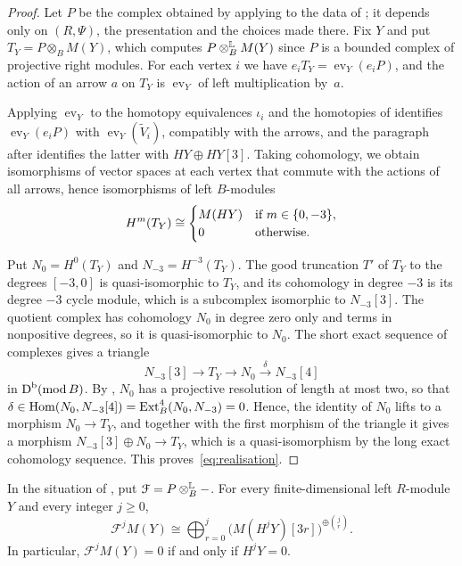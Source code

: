 \begin{proof}
  Let $P$ be the complex obtained by applying  to the
  data of ; it depends only on $(R,\Psi)$, the presentation
  and the choices made there. Fix $Y$ and put ${T_Y=P\otimes_BM(Y)}$, which
  computes ${P\Lotimes[B]M(Y)}$ since $P$ is a bounded complex of projective right
  modules. For each vertex $i$ we have ${e_iT_Y=\operatorname{ev}_Y(e_iP)}$, and
  the action of an arrow $a$ on $T_Y$ is $\operatorname{ev}_Y$ of left
  multiplication by~$a$.

  Applying $\operatorname{ev}_Y$ to the homotopy equivalences $\iota_i$ and the
  homotopies of  identifies $\operatorname{ev}_Y(e_iP)$
  with $\operatorname{ev}_Y(\widetilde{V}_i)$, compatibly with the arrows, and
  the paragraph after  identifies the latter with
  ${HY\oplus HY[3]}$. Taking cohomology, we obtain isomorphisms of vector spaces
  at each vertex that commute with the actions of all arrows, hence
  isomorphisms of left $B$-modules
  \[
    H^m(T_Y)\cong
    \begin{cases}
      M(HY)&\text{if }m\in\set{0,-3},\\
      0&\text{otherwise.}
    \end{cases}
  \]

  Put ${N_0=H^0(T_Y)}$ and ${N_{-3}=H^{-3}(T_Y)}$. The good truncation $T'$ of
  $T_Y$ to the degrees ${[-3,0]}$ is quasi-isomorphic to $T_Y$, and its
  cohomology in degree ${-3}$ is its degree ${-3}$ cycle module, which is a
  subcomplex isomorphic to $N_{-3}[3]$. The quotient complex has cohomology
  $N_0$ in degree zero only and terms in nonpositive degrees, so it is
  quasi-isomorphic to $N_0$. The short exact sequence of complexes gives a
  triangle
  \[
    N_{-3}[3]\longrightarrow T_Y\longrightarrow N_0\xrightarrow{\ \delta\ }
    N_{-3}[4]
  \]
  in $\DerCat[b]{\operatorname{mod}B}$. By ,
  $N_0$ has a projective resolution of length at most two, so that
  ${\delta\in\Hom{N_0}{N_{-3}[4]}=\operatorname{Ext}^4_B(N_0,N_{-3})=0}$. Hence,
  the identity of $N_0$ lifts to a morphism ${N_0\to T_Y}$, and together with
  the first morphism of the triangle it gives a morphism
  ${N_{-3}[3]\oplus N_0\to T_Y}$, which is a quasi-isomorphism by the long exact
  cohomology sequence. This proves~\eqref{eq:realisation}.
\end{proof}

\begin{corollary}
  \label{coro:realisation-iterates}
  In the situation of , put ${\mathcal{F}=P\Lotimes[B]-}$.
  For every finite-dimensional left $R$-module $Y$ and every integer
  ${j\geq0}$,
  \[
    \mathcal{F}^jM(Y)\cong\bigoplus_{r=0}^{j}
    \bigl(M(H^jY)[3r]\bigr)^{\oplus\binom{j}{r}}.
  \]
  In particular, ${\mathcal{F}^jM(Y)=0}$ if and only if ${H^jY=0}$.
\end{corollary}

